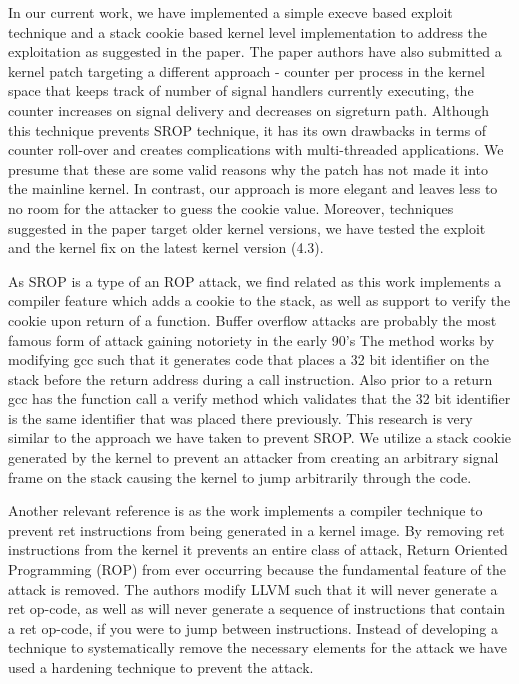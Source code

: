 \documentclass{sig-alternate-05-2015}
\begin{document}
\par In our current work, we have implemented a simple execve based 
exploit technique and a stack cookie based kernel level implementation
to address the exploitation as suggested in the paper. The paper authors
have also submitted a kernel patch targeting a different approach - counter
per process in the kernel space that keeps track of number of signal handlers
currently executing, the counter increases on signal delivery and decreases
on sigreturn path. Although this technique prevents SROP technique, it has
its own drawbacks in terms of counter roll-over and creates complications with
multi-threaded applications. We presume that these are some valid reasons why
the patch has not made it into the mainline kernel. In contrast, our approach 
is more elegant and leaves less to no room for the attacker to guess the cookie
value. Moreover, techniques suggested in the paper target older kernel versions, 
we have tested the exploit and the kernel fix on the latest kernel version (4.3).

\par As SROP is a type of an ROP attack, we find \cite{cowan1998stackguard}
related as this work implements a compiler feature which adds a cookie to the stack, 
as well as support to verify the cookie upon return of a function.  Buffer overflow 
attacks are probably the most famous form of attack gaining notoriety in the early 90's
The method works by modifying gcc such that it generates code that places a
32 bit identifier on the stack before the return address during a call instruction.
Also prior to a return gcc has the function call a verify method which validates 
that the 32 bit identifier is the same identifier that was placed there previously.
This research is very similar to the approach we have taken to prevent SROP.  
We utilize a stack cookie generated by the kernel to prevent an attacker from 
creating an arbitrary signal frame on the stack causing the kernel to jump arbitrarily 
through the code.

\par Another relevant reference is \cite{li2010defeating} as the work implements a 
compiler technique to prevent ret instructions from being generated in a kernel image. 
By removing ret instructions from the kernel it prevents an entire class of attack, 
Return Oriented Programming (ROP) from ever occurring because the fundamental feature 
of the attack is removed. The authors modify LLVM such that it will never generate a ret 
op-code, as well as will never generate a sequence of instructions that contain a ret op-code, 
if you were to jump between instructions. Instead of developing a technique to systematically 
remove the necessary elements for the attack we have used a hardening technique to 
prevent the attack.



\end{document}
